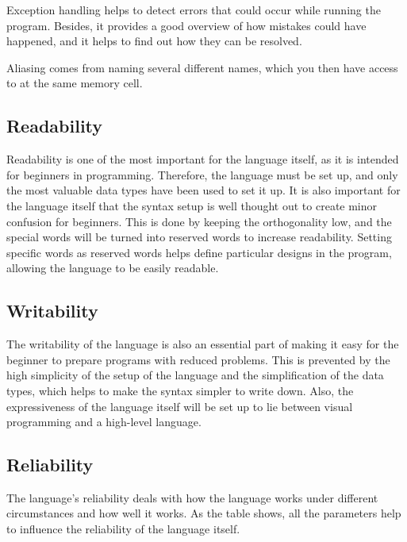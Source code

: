 Exception handling helps to detect errors that could occur while running the program. Besides, it provides a good overview of how mistakes could have happened, and it helps to find out how they can be resolved.

Aliasing comes from naming several different names, which you then have access to at the same memory cell.




\subsection{Readability}
Readability is one of the most important for the language itself, as it is intended for beginners in programming. 
Therefore, the language must be set up, and only the most valuable data types have been used to set it up. It is also important for the language itself that the syntax setup is well thought out to create minor confusion for beginners.
 This is done by keeping the orthogonality low, and the special words will be turned into reserved words to increase readability. 
Setting specific words as reserved words helps define particular designs in the program, allowing the language to be easily readable.

\subsection{Writability}

The writability of the language is also an essential part of making it easy for the beginner to prepare programs with reduced problems. 
This is prevented by the high simplicity of the setup of the language and the simplification of the data types, which helps to make the syntax simpler to write down.
 Also, the expressiveness of the language itself will be set up to lie between visual programming and a high-level language.

 \subsection{Reliability}
 The language's reliability deals with how the language works under different circumstances and how well it works. 
 As the table shows, all the parameters help to influence the reliability of the language itself.